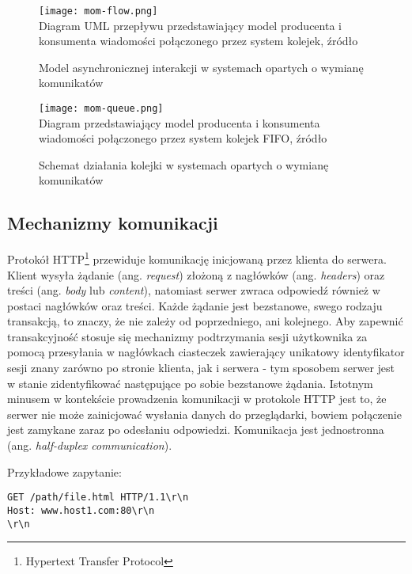 \begin{figure}[H]
  \caption[Model asynchronicznej interakcji w systemach opartych o wymianę komunikatów]{Model asynchronicznej interakcji w systemach opartych o wymianę komunikatów}
  \centering
    \texttt{[image: mom-flow.png]} \\
    Diagram UML przepływu przedstawiający model producenta i konsumenta wiadomości połączonego przez system kolejek, źródło\cite{message-oriented-middleware}
\end{figure}

\begin{figure}[H]
  \caption[Schemat działania kolejki w systemach opartych o wymianę komunikatów]{Schemat działania kolejki w systemach opartych o wymianę komunikatów}
  \centering
    \texttt{[image: mom-queue.png]} \\
    Diagram przedstawiający model producenta i konsumenta wiadomości połączonego przez system kolejek FIFO, źródło\cite{message-oriented-middleware}
\end{figure}

\subsection{Mechanizmy komunikacji}
\label{sub:communication-methods}

Protokół HTTP\footnote{Hypertext Transfer Protocol} przewiduje komunikację inicjowaną przez klienta do serwera\cite{http-rfc}. Klient wysyła żądanie (ang. \emph{request}) złożoną z nagłówków (ang. \emph{headers}) oraz treści (ang. \emph{body} lub \emph{content}), natomiast serwer zwraca odpowiedź również w postaci nagłówków oraz treści. Każde żądanie jest bezstanowe, swego rodzaju transakcją, to znaczy, że nie zależy od poprzedniego, ani kolejnego. Aby zapewnić transakcyjność stosuje się mechanizmy podtrzymania sesji użytkownika za pomocą przesyłania w nagłówkach ciasteczek zawierający unikatowy identyfikator sesji znany zarówno po stronie klienta, jak i serwera - tym sposobem serwer jest w stanie zidentyfikować następujące po sobie bezstanowe żądania. Istotnym minusem w kontekście prowadzenia komunikacji w protokole HTTP jest to, że serwer nie może zainicjować wysłania danych do przeglądarki, bowiem połączenie jest zamykane zaraz po odesłaniu odpowiedzi. Komunikacja jest jednostronna (ang. \emph{half-duplex communication}).

Przykładowe zapytanie:
\lstset{language=Octave}
\begin{lstlisting}
GET /path/file.html HTTP/1.1\r\n
Host: www.host1.com:80\r\n
\r\n
\end{lstlisting}

